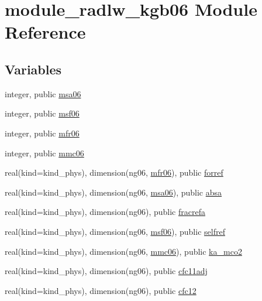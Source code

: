 \hypertarget{namespacemodule__radlw__kgb06}{}\section{module\+\_\+radlw\+\_\+kgb06 Module Reference}
\label{namespacemodule__radlw__kgb06}
\subsection*{Variables}
\begin{DoxyCompactItemize}
\item 
integer, public \hyperlink{namespacemodule__radlw__kgb06_add7b5d0d3ea44e1e677948c33e870333}{msa06}
\item 
integer, public \hyperlink{group__module__radlw__main_ga65f808aeb87457d383dd7f9366878fb9}{msf06}
\item 
integer, public \hyperlink{group__module__radlw__main_gaaf1f13cdb5c2888b416a91e8b17e41d8}{mfr06}
\item 
integer, public \hyperlink{group__module__radlw__main_gaf7a377cb66fd48348789c20f5a31dec6}{mmc06}
\item 
real(kind=kind\+\_\+phys), dimension(ng06, \hyperlink{group__module__radlw__main_gaaf1f13cdb5c2888b416a91e8b17e41d8}{mfr06}), public \hyperlink{group__module__radlw__main_ga6a0467b666bc75f90ae58fa4f58f07f0}{forref}
\item 
real(kind=kind\+\_\+phys), dimension(ng06, \hyperlink{namespacemodule__radlw__kgb06_add7b5d0d3ea44e1e677948c33e870333}{msa06}), public \hyperlink{group__module__radlw__main_ga21bd40309855c89a64b88be171bfde59}{absa}
\item 
real(kind=kind\+\_\+phys), dimension(ng06), public \hyperlink{group__module__radlw__main_ga1354ecbc5f07cd763847333e680c686a}{fracrefa}
\item 
real(kind=kind\+\_\+phys), dimension(ng06, \hyperlink{group__module__radlw__main_ga65f808aeb87457d383dd7f9366878fb9}{msf06}), public \hyperlink{group__module__radlw__main_ga98901725947a4477924a47af5e67277e}{selfref}
\item 
real(kind=kind\+\_\+phys), dimension(ng06, \hyperlink{group__module__radlw__main_gaf7a377cb66fd48348789c20f5a31dec6}{mmc06}), public \hyperlink{group__module__radlw__main_gadb5dab732383b82e89f1048ab5150c23}{ka\+\_\+mco2}
\item 
real(kind=kind\+\_\+phys), dimension(ng06), public \hyperlink{group__module__radlw__main_ga8b0813723ba69b1afbe2552f6b730267}{cfc11adj}
\item 
real(kind=kind\+\_\+phys), dimension(ng06), public \hyperlink{group__module__radlw__main_ga44f5934520edc537b5df004774b0ef71}{cfc12}
\end{DoxyCompactItemize}


